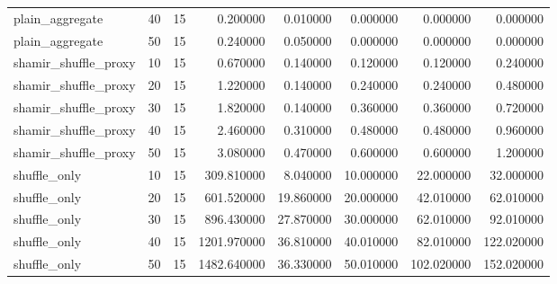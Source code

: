 \begin{table}
\begin{tabular}{lrrrrrrr}
plain_aggregate & 40 & 15 & 0.200000 & 0.010000 & 0.000000 & 0.000000 & 0.000000 \\
plain_aggregate & 50 & 15 & 0.240000 & 0.050000 & 0.000000 & 0.000000 & 0.000000 \\
shamir_shuffle_proxy & 10 & 15 & 0.670000 & 0.140000 & 0.120000 & 0.120000 & 0.240000 \\
shamir_shuffle_proxy & 20 & 15 & 1.220000 & 0.140000 & 0.240000 & 0.240000 & 0.480000 \\
shamir_shuffle_proxy & 30 & 15 & 1.820000 & 0.140000 & 0.360000 & 0.360000 & 0.720000 \\
shamir_shuffle_proxy & 40 & 15 & 2.460000 & 0.310000 & 0.480000 & 0.480000 & 0.960000 \\
shamir_shuffle_proxy & 50 & 15 & 3.080000 & 0.470000 & 0.600000 & 0.600000 & 1.200000 \\
shuffle_only & 10 & 15 & 309.810000 & 8.040000 & 10.000000 & 22.000000 & 32.000000 \\
shuffle_only & 20 & 15 & 601.520000 & 19.860000 & 20.000000 & 42.010000 & 62.010000 \\
shuffle_only & 30 & 15 & 896.430000 & 27.870000 & 30.000000 & 62.010000 & 92.010000 \\
shuffle_only & 40 & 15 & 1201.970000 & 36.810000 & 40.010000 & 82.010000 & 122.020000 \\
shuffle_only & 50 & 15 & 1482.640000 & 36.330000 & 50.010000 & 102.020000 & 152.020000 \\
\bottomrule
\end{tabular}
\end{table}
